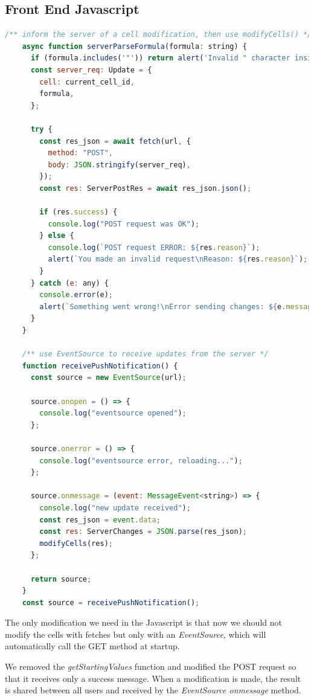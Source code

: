 \documentclass[12pt, a4paper]{article}
\begin{document}
  \subsection{Front End Javascript}
  \begin{lstlisting}[language=javascript, caption={EventSource code}]
    /** inform the server of a cell modification, then use modifyCells() */
    async function serverParseFormula(formula: string) {
      if (formula.includes('"')) return alert('Invalid " character inside input');
      const server_req: Update = {
        cell: current_cell_id,
        formula,
      };

      try {
        const res_json = await fetch(url, {
          method: "POST",
          body: JSON.stringify(server_req),
        });
        const res: ServerPostRes = await res_json.json();

        if (res.success) {
          console.log("POST request was OK");
        } else {
          console.log(`POST request ERROR: ${res.reason}`);
          alert(`You made an invalid request\nReason: ${res.reason}`);
        }
      } catch (e: any) {
        console.error(e);
        alert(`Something went wrong!\nError sending changes: ${e.message}`);
      }
    }
    
    /** use EventSource to receive updates from the server */
    function receivePushNotification() {
      const source = new EventSource(url);

      source.onopen = () => {
        console.log("eventsource opened");
      };

      source.onerror = () => {
        console.log("eventsource error, reloading...");
      };

      source.onmessage = (event: MessageEvent<string>) => {
        console.log("new update received");
        const res_json = event.data;
        const res: ServerChanges = JSON.parse(res_json);
        modifyCells(res);
      };

      return source;
    }
    const source = receivePushNotification();
  \end{lstlisting}
  The only modification we need in the Javascript is that now we should not modify the cells with fetches but only with an \textit{EventSource}, which will automatically call the GET method at startup.

  We removed the \textit{getStartingValues} function and modified the POST request so that it receives only a success message. When a modification is made, the result is shared between all users and received by the \textit{EventSource onmessage} method.
\end{document}
